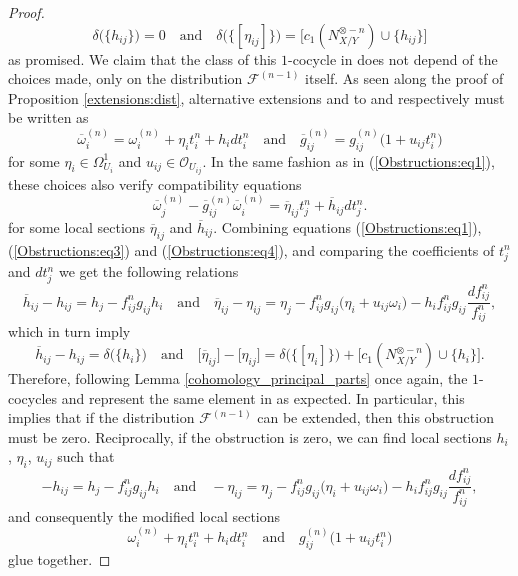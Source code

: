 \documentclass[10pt,a4paper]{amsart}
\newcommand{\F}{\mathscr{F}}
\newcommand{\OO}{\mathcal{O}}
\newcommand{\PP}{\mathcal{P}}
\begin{document}
\begin{proof}
\begin{equation*}
\delta\big(\{h_{ij}\}\big) = 0 \quad\text{and}\quad \delta\big(\{[\eta_{ij}]\}\big) = \big[c_1(N_{X/Y}^{\otimes - n})\cup \{h_{ij}\}\big]
\end{equation*} 
as promised. We claim that the class of this $1$-cocycle in \smash{$H^1\big(X,\PP_{\F,N_{X/Y}^{\otimes - n}}\big)$} does not depend of the choices made, only on the distribution $\F^{(n-1)}$ itself. As seen along the proof of Proposition \ref{extensions:dist}, alternative extensions  and  to  and  respectively must be written as
\begin{equation}\label{Obstructions:eq3}
\overline{\omega}_i^{(n)} = \omega_i^{(n)}+ \eta_it_i^n+h_idt_i^n\quad\text{and}\quad \overline{g}_{ij}^{(n)} = g_{ij}^{(n)}\big(1+u_{ij}t_i^n\big) 
\end{equation}
for some $\eta_i\in \Omega^1_{U_i}$ and $u_{ij}\in \OO_{U_{ij}}$.
In the same fashion as in (\ref{Obstructions:eq1}), these choices also verify compatibility equations
\begin{equation}\label{Obstructions:eq4}
\overline{\omega}^{(n)}_j - \overline{g}_{ij}^{(n)}\overline{\omega}_i^{(n)} = \overline{\eta}_{ij} t_j^n+ \overline{h}_{ij}dt_j^n.  
\end{equation}
for some local sections $\overline{\eta}_{ij}$ and $\overline{h}_{ij}$. Combining equations (\ref{Obstructions:eq1}), (\ref{Obstructions:eq3}) and (\ref{Obstructions:eq4}), and comparing the coefficients of $t_j^n$ and $dt_j^n$ we get the following relations 
\[
\overline{h}_{ij}-h_{ij} = h_{j}-f_{ij}^ng_{ij}h_i\quad\text{and}\quad \overline{\eta}_{ij}-\eta_{ij} = \eta_{j}-f_{ij}^ng_{ij}\big(\eta_{i}+u_{ij}\omega_i\big) -h_i f_{ij}^ng_{ij} \frac{df_{ij}^n}{f_{ij}^n},
\]
which in turn imply
\[
\overline{h}_{ij}-h_{ij} =\delta\big(\{h_{i}\}\big)\quad\text{and}\quad \big[\overline{\eta}_{ij}\big]-\big[\eta_{ij}\big]=\delta\big(\{[\eta_{i}]\}\big)+\big[c_1(N_{X/Y}^{\otimes - n})\cup \{h_{i}\}\big].
\]
Therefore, following Lemma \ref{cohomology_principal_parts} once again, the $1$-cocycles  and   represent the same element in \smash{$H^1\big(X,\PP_{\F,N_{X/Y}^{\otimes - n}}\big)$} as expected. In particular, this implies that if the distribution $\F^{(n-1)}$ can be extended, then this obstruction must be zero. Reciprocally, if the obstruction  is zero, we can find local sections $h_i$, $\eta_i$, $u_{ij}$ such that
\[
-h_{ij} = h_{j}-f_{ij}^ng_{ij}h_i\quad\text{and}\quad -\eta_{ij} = \eta_{j}-f_{ij}^ng_{ij}\big(\eta_{i}+u_{ij}\omega_i\big) -h_i f_{ij}^ng_{ij} \frac{df_{ij}^n}{f_{ij}^n},
\]
and consequently the modified local sections
\[
\omega_i^{(n)}+ \eta_it_i^n+h_idt_i^n\quad\text{and}\quad g_{ij}^{(n)}\big(1+u_{ij}t_i^n\big) 
\]
glue together.
\end{proof}
\end{document}
